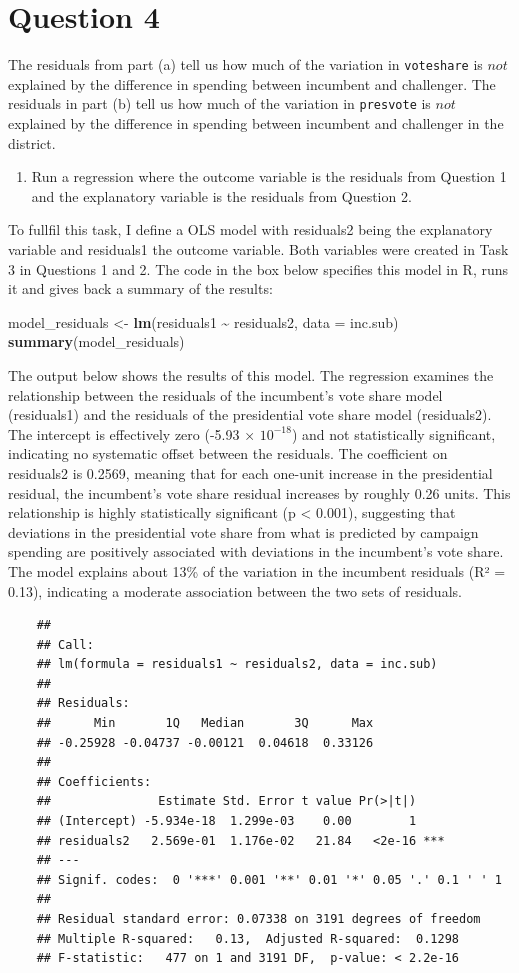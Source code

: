\documentclass[
]{article}
\newenvironment{Shaded}{\begin{snugshade}}{\end{snugshade}}
\newcommand{\AttributeTok}[1]{\textcolor[rgb]{0.13,0.29,0.53}{#1}}
\newcommand{\FunctionTok}[1]{\textcolor[rgb]{0.13,0.29,0.53}{\textbf{#1}}}
\newcommand{\NormalTok}[1]{#1}
\newcommand{\OtherTok}[1]{\textcolor[rgb]{0.56,0.35,0.01}{#1}}
\newcommand{\SpecialCharTok}[1]{\textcolor[rgb]{0.81,0.36,0.00}{\textbf{#1}}}
\begin{document}
\section*{Question 4}
\noindent The residuals from part (a) tell us how much of the variation in \texttt{voteshare} is $not$ explained by the difference in spending between incumbent and challenger. The residuals in part (b) tell us how much of the variation in \texttt{presvote} is $not$ explained by the difference in spending between incumbent and challenger in the district.
\begin{enumerate}
	\item Run a regression where the outcome variable is the residuals from Question 1 and the explanatory variable is the residuals from Question 2.
\end{enumerate}
To fullfil this task, I define a OLS model with residuals2 being the explanatory variable and residuals1 the outcome variable. Both variables were created in Task 3 in Questions 1 and 2. The code in the box below specifies this model in R, runs it and gives back a summary of the results:
\begin{Shaded}
	\begin{Highlighting}[]
\NormalTok{model\_residuals }\OtherTok{\textless{}{-}} \FunctionTok{lm}\NormalTok{(residuals1 }\SpecialCharTok{\textasciitilde{}}\NormalTok{ residuals2, }\AttributeTok{data =}\NormalTok{ inc.sub)}
\FunctionTok{summary}\NormalTok{(model\_residuals)}
	\end{Highlighting}
\end{Shaded}
The output below shows the results of this model. The regression examines the relationship between the residuals of the incumbent’s vote share model (residuals1) and the residuals of the presidential vote share model (residuals2). The intercept is effectively zero (-5.93 × $10^{-18}$) and not statistically significant, indicating no systematic offset between the residuals. The coefficient on residuals2 is 0.2569, meaning that for each one-unit increase in the presidential residual, the incumbent’s vote share residual increases by roughly 0.26 units. This relationship is highly statistically significant (p < 0.001), suggesting that deviations in the presidential vote share from what is predicted by campaign spending are positively associated with deviations in the incumbent’s vote share. The model explains about 13\% of the variation in the incumbent residuals (R² = 0.13), indicating a moderate association between the two sets of residuals.
\begin{verbatim}
	## 
	## Call:
	## lm(formula = residuals1 ~ residuals2, data = inc.sub)
	## 
	## Residuals:
	##      Min       1Q   Median       3Q      Max 
	## -0.25928 -0.04737 -0.00121  0.04618  0.33126 
	## 
	## Coefficients:
	##               Estimate Std. Error t value Pr(>|t|)    
	## (Intercept) -5.934e-18  1.299e-03    0.00        1    
	## residuals2   2.569e-01  1.176e-02   21.84   <2e-16 ***
	## ---
	## Signif. codes:  0 '***' 0.001 '**' 0.01 '*' 0.05 '.' 0.1 ' ' 1
	## 
	## Residual standard error: 0.07338 on 3191 degrees of freedom
	## Multiple R-squared:   0.13,  Adjusted R-squared:  0.1298 
	## F-statistic:   477 on 1 and 3191 DF,  p-value: < 2.2e-16
\end{verbatim}
\end{document}
